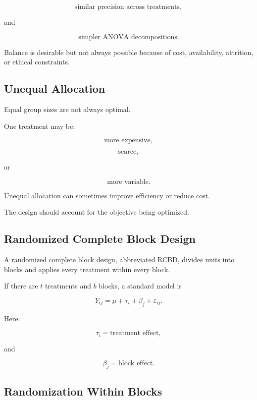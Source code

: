 \[
\boxed{
\text{similar precision across treatments},
}
\]

and

\[
\boxed{
\text{simpler ANOVA decompositions}.
}
\]

Balance is desirable but not always possible because of cost,
availability, attrition, or ethical constraints.

\subsection{Unequal Allocation}
\label{subsec:unequal-treatment-allocation}

Equal group sizes are not always optimal.

One treatment may be:

\[
\boxed{
\text{more expensive},
}
\]

\[
\boxed{
\text{scarce},
}
\]

or

\[
\boxed{
\text{more variable}.
}
\]

Unequal allocation can sometimes improve efficiency or reduce cost.

The design should account for the objective being optimized.

\subsection{Randomized Complete Block Design}
\label{subsec:randomized-complete-block-design-detail}

A randomized complete block design, abbreviated RCBD, divides units into
blocks and applies every treatment within every block.

If there are \(t\) treatments and \(b\) blocks, a standard model is

\[
\boxed{
Y_{ij}
=
\mu
+
\tau_i
+
\beta_j
+
\varepsilon_{ij}.
}
\]

Here:

\[
\tau_i
=
\text{treatment effect},
\]

and

\[
\beta_j
=
\text{block effect}.
\]

\subsection{Randomization Within Blocks}
\label{subsec:randomization-within-blocks}

